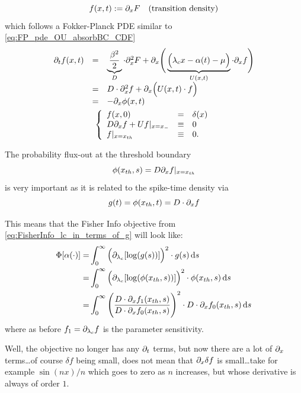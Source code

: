 \documentclass{article}
\begin{document}
\begin{equation}
f(x,t) := {\partial}_x F   \quad
 \textrm{(transition density)}
 \label{eq:transition_density}
\end{equation}
which follows a Fokker-Planck PDE similar to \cref{eq:FP_pde_OU_absorbBC_CDF}
\begin{equation}
\begin{gathered}
\begin{array}{lcl}
	{\partial}_t f (x,t) &=&
					\underbrace{\frac{{\beta}^2 }{2}}_{D}\cdot {\partial}^2_x F 
					+ {\partial}_x \Bigg(  
					\underbrace{\Big({ \lambda_{c} } x - {\alpha}(t) - {\mu }  \Big)}_{U(x,t)}  \cdot {\partial}_x
					f \Bigg)
					\\
					&=&
					D \cdot {\partial}^2_x f +
					{\partial}_x  \Big( U(x,t) \cdot f \Big)
					\\
					&=&
					- {\partial}_x \phi(x,t)
					\end{array}
	\\
	\left\{ \begin{array}{lcl}
	 f (x,0) &=& \delta(x)
	\\
	D {\partial}_xf + U f |_{x={ x_{-} }} &\equiv& 0 
	\\
	f |_{x={ x_{th} }} &\equiv& 0.
	\end{array} \right.
\label{eq:FP_pde_OU_absorbBC_CDF}
\end{gathered}
\end{equation}

The probability flux-out at the threshold boundary $$\phi({ x_{th} }, s) = D
{\partial}_xf |_{x={ x_{th} }}$$ is very important as it is related to the spike-time density
via $$g( t)  = \phi({ x_{th} }, t) = D\cdot {\partial}_x f$$

This means that the Fisher Info objective from
\cref{eq:FisherInfo_lc_in_terms_of_g} will look like:
\begin{align} 
 {\Phi}[{\alpha}(\cdot)] =& 
\int_0^{\infty}  \Big( {\partial}_{{ \lambda_{c} }} [ \log(
g(s) )] \Big)^2  \cdot g(s) \, \mathrm{d} s
\nonumber
\\
=& \int_0^{\infty}  \Big( {\partial}_{{ \lambda_{c} }} [ \log(
\phi({ x_{th} }, s) )] \Big)^2  \cdot \phi({ x_{th} }, s)  \, \mathrm{d} s
\nonumber
\\
=& 
\int_0^{\infty}  \Bigg( \frac{D \cdot {\partial}_x f_1({ x_{th} },s)}
							 {D \cdot {\partial}_x f_0({ x_{th} },s)} \Bigg)^2  
\cdot D \cdot {\partial}_x f_0({ x_{th} },s) \, \mathrm{d} s
\label{eq:FisherInfo_lc_in_terms_of_f0_f1}
\end{align}
where as before $f_1 = {\partial}_{ \lambda_{c} } f$ is the parameter sensitivity.

Well, the objective no longer has any ${\partial}_t$ terms, but now there are a lot of
${\partial}_x$ terms\ldots of course $\delta f$ being small, does not mean that ${\partial}_x
\delta f$ is small\ldots take for example $\sin(nx) / n$ which goes to zero as
$n$ increases, but whose derivative is always of order $1$.
\end{document}
